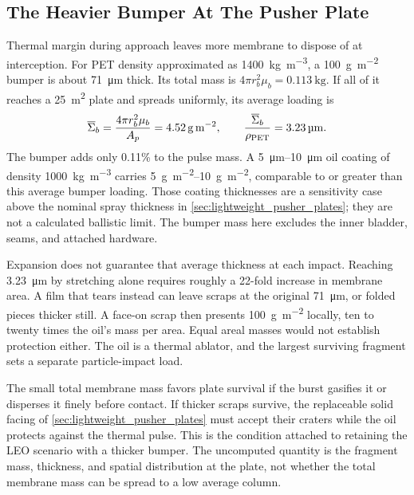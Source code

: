 \documentclass{article}
\begin{document}
\subsection{The Heavier Bumper At The Pusher Plate}
Thermal margin during approach leaves more membrane to dispose of at interception. For PET density approximated as \SI{1400}{\kilogram\per\cubic\meter}, a \SI{100}{\gram\per\square\meter} bumper is about \SI{71}{\micro\meter} thick. Its total mass is $4\pi r_b^2\mu_b=\SI{0.113}{\kilogram}$. If all of it reaches a \SI{25}{\square\meter} plate and spreads uniformly, its average loading is
\begin{equation}\label{eq:leo_bumper_plate_column}
\overline{\Sigma}_b=\frac{4\pi r_b^2\mu_b}{A_p}
=\SI{4.52}{\gram\per\square\meter},
\qquad
\frac{\overline{\Sigma}_b}{\rho_{\rm PET}}=\SI{3.23}{\micro\meter}.
\end{equation}
The bumper adds only 0.11\% to the pulse mass. A \SIrange{5}{10}{\micro\meter} oil coating of density \SI{1000}{\kilogram\per\cubic\meter} carries \SIrange{5}{10}{\gram\per\square\meter}, comparable to or greater than this average bumper loading. Those coating thicknesses are a sensitivity case above the nominal spray thickness in \autoref{sec:lightweight_pusher_plates}; they are not a calculated ballistic limit. The bumper mass here excludes the inner bladder, seams, and attached hardware.

Expansion does not guarantee that average thickness at each impact. Reaching \SI{3.23}{\micro\meter} by stretching alone requires roughly a 22-fold increase in membrane area. A film that tears instead can leave scraps at the original \SI{71}{\micro\meter}, or folded pieces thicker still. A face-on scrap then presents \SI{100}{\gram\per\square\meter} locally, ten to twenty times the oil's mass per area. Equal areal masses would not establish protection either. The oil is a thermal ablator, and the largest surviving fragment sets a separate particle-impact load.

The small total membrane mass favors plate survival if the burst gasifies it or disperses it finely before contact. If thicker scraps survive, the replaceable solid facing of \autoref{sec:lightweight_pusher_plates} must accept their craters while the oil protects against the thermal pulse. This is the condition attached to retaining the LEO scenario with a thicker bumper. The uncomputed quantity is the fragment mass, thickness, and spatial distribution at the plate, not whether the total membrane mass can be spread to a low average column.
\end{document}
